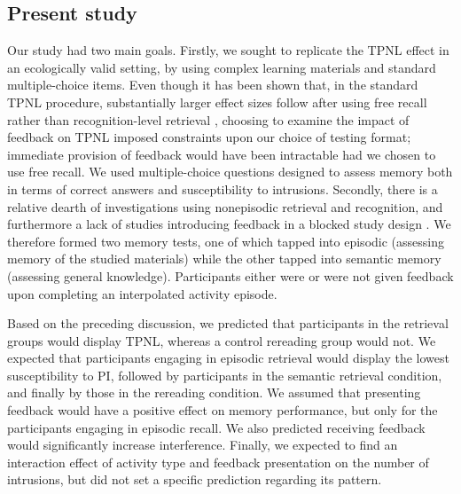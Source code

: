 \documentclass[../main.tex]{subfiles}
\begin{document}
\subsection{Present study\label{present}}

Our study had two main goals. Firstly, we sought to replicate the TPNL 
effect in an ecologically valid setting, by using complex learning materials 
and standard multiple-choice items. Even though it has been shown that, in 
the standard TPNL procedure, substantially larger effect sizes follow after 
using free recall rather than recognition-level retrieval 
 \citep{chanRetrievalPotentiatesNew2018}, choosing to examine the impact of 
 feedback on TPNL imposed constraints upon our choice of testing format; 
 immediate provision of feedback would have been intractable had we chosen 
 to use free recall. We used multiple-choice questions designed to assess 
 memory both in terms of correct answers and susceptibility to intrusions. 
 Secondly, there is a relative dearth of investigations using nonepisodic 
 retrieval and recognition, and furthermore a lack of studies introducing 
 feedback in a blocked study design 
\citep{chanRetrievalPotentiatesNew2018}. We therefore formed two memory 
tests, one of which tapped into episodic (assessing memory of the studied 
materials) while the other tapped into semantic memory (assessing general 
knowledge). Participants either were or were not given feedback upon 
completing an interpolated activity episode.

Based on the preceding discussion, we predicted that participants in the 
retrieval groups would display TPNL, whereas a control rereading group would 
not. We expected that participants engaging in episodic retrieval would 
display the lowest susceptibility to PI, followed by participants in the 
semantic retrieval condition, and finally by those in the rereading 
condition. We assumed that presenting feedback would have a positive effect 
on memory performance, but only for the participants engaging in episodic 
recall. We also predicted receiving feedback would significantly increase 
interference. Finally, we expected to find an interaction effect of activity 
type and feedback presentation on the number of intrusions, but did not set 
a specific prediction regarding its pattern.
 
{
	\biblio
}
\end{document}
